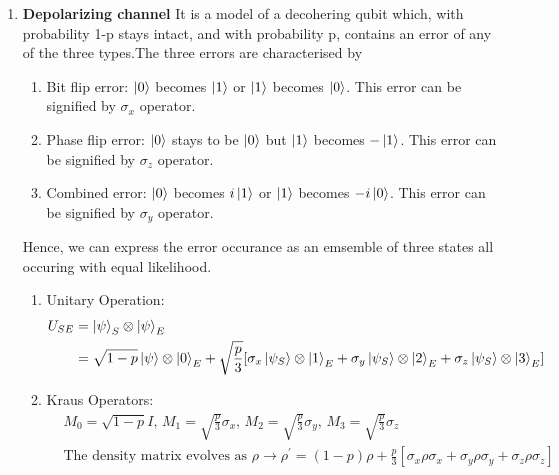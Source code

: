 \begin{enumerate}
    \item \textbf{Depolarizing channel}
    It is a model of a decohering qubit which, with probability 1-p stays intact, and with probability p, contains an error of any of the three types.The three errors are characterised by \begin{enumerate}
        \item Bit flip error: $\ket{0}$ becomes $\ket{1}$ or $\ket{1}$ becomes $\ket{0}$. This error can be signified by $\sigma_x$ operator.
         \item Phase flip error: $\ket{0}$ stays to be $\ket{0}$ but $\ket{1}$ becomes $-\ket{1}$. This error can be signified by $\sigma_z$ operator.
          \item Combined error: $\ket{0}$ becomes $i\ket{1}$ or $\ket{1}$ becomes $-i\ket{0}$. This error can be signified by $\sigma_y$ operator.
    \end{enumerate}
    Hence, we can express the error occurance as an emsemble of three states all occuring with equal likelihood.
    \begin{enumerate}
        \item Unitary Operation:
        \begin{equation}
        \begin{aligned}
            U_{SE} &= \ket{\psi}_S \otimes \ket{\psi}_E \\
            & = \sqrt{1-p}\ket{\psi} \otimes \ket{0}_E + \sqrt{\frac{p}{3}}[\sigma_x\ket{\psi_S} \otimes \ket{1}_E + \sigma_y\ket{\psi_S} \otimes \ket{2}_E + \sigma_z\ket{\psi_S} \otimes \ket{3}_E]
        \end{aligned}
        \end{equation}
        \item Kraus Operators:
        \begin{equation}
            \begin{aligned}
                &M_0 = \sqrt{1-p}I \text{, }
                M_1 = \sqrt{\frac{p}{3}}\sigma_x \text{, }
                M_2 = \sqrt{\frac{p}{3}}\sigma_y \text{, }
                M_3 = \sqrt{\frac{p}{3}}\sigma_z \\
                &\text{The density matrix evolves as } \rho \rightarrow \rho^{'} = (1-p)\rho + \frac{p}{3}[\sigma_x\rho\sigma_x + \sigma_y\rho\sigma_y + \sigma_z\rho\sigma_z]
            \end{aligned}
        \end{equation}
    \end{enumerate}

\end{enumerate}
